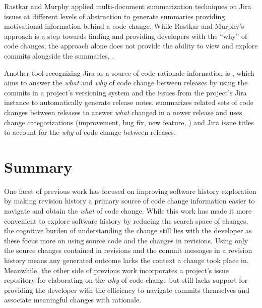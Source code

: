 Rastkar and Murphy \cite{rastkar_why_2013} applied multi-document summarization techniques on Jira issues 
at different levels of abstraction to generate summaries providing motivational information behind a code change.
While Rastkar and Murphy's approach is a step towards finding and providing developers with the ``why'' of code changes, 
the approach alone does not provide the ability to view and explore commits alongside the summaries,
.

Another tool recognizing Jira as a source of code rationale information is  \cite{moreno_arena_2017}, 
which aims to answer the \emph{what} and \emph{why} of code change between releases by 
using the commits in a project's versioning system and the issues from the project's Jira instance 
to automatically generate release notes. 
 summarizes related sets of code changes between releases to answer \emph{what} 
changed in a newer release and uses change categorizations (\eg improvement, bug fix, new feature, \etc) 
and Jira issue titles to account for the \emph{why} of code change between releases.


\section{Summary}

One facet of previous work has focused on improving software history exploration by making revision history 
a primary source of code change information easier to navigate and obtain the \emph{what} of code change.
While this work has made it more convenient to explore software history by reducing the search space of changes, 
the cognitive burden of understanding the change still lies with the developer 
as these focus more on using source code and the changes in revisions.
Using only the source changes contained in revisions and the commit messages in a revision history 
means any generated outcome lacks the context a change took place in.
Meanwhile, the other side of previous work incorporates a project's issue repository for elaborating 
on the \emph{why} of code change but still lacks support for providing the developer with the efficiency to 
navigate commits themselves and associate meaningful changes with rationale.

